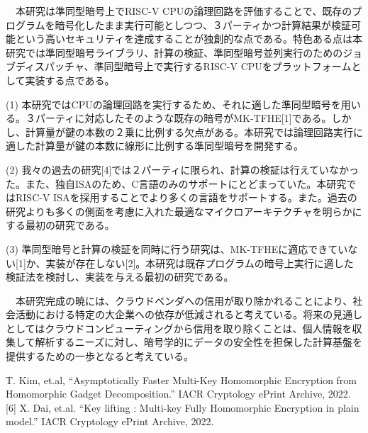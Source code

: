 
　本研究は準同型暗号上でRISC-V CPUの論理回路を評価することで、既存のプログラムを暗号化したまま実行可能としつつ、３パーティかつ計算結果が検証可能という高いセキュリティを達成することが独創的な点である。特色ある点は本研究では準同型暗号ライブラリ、計算の検証、準同型暗号並列実行のためのジョブディスパッチャ、準同型暗号上で実行するRISC-V CPUをプラットフォームとして実装する点である。


\noindent(1)	本研究ではCPUの論理回路を実行するため、それに適した準同型暗号を用いる。３パーティに対応したそのような既存の暗号がMK-TFHE[1]である。しかし、計算量が鍵の本数の２乗に比例する欠点がある。本研究では論理回路実行に適した計算量が鍵の本数に線形に比例する準同型暗号を開発する。

\noindent(2)	我々の過去の研究[4]では２パーティに限られ、計算の検証は行えていなかった。また、独自ISAのため、C言語のみのサポートにとどまっていた。本研究ではRISC-V ISAを採用することでより多くの言語をサポートする。また。過去の研究よりも多くの側面を考慮に入れた最適なマイクロアーキテクチャを明らかにする最初の研究である。

\noindent(3)	準同型暗号と計算の検証を同時に行う研究は、MK-TFHEに適応できていない[1]か、実装が存在しない[2]。本研究は既存プログラムの暗号上実行に適した検証法を検討し、実装を与える最初の研究である。


　本研究完成の暁には、クラウドベンダへの信用が取り除かれることにより、社会活動における特定の大企業への依存が低減されると考えている。将来の見通しとしてはクラウドコンピューティングから信用を取り除くことは、個人情報を収集して解析するニーズに対し、暗号学的にデータの安全性を担保した計算基盤を提供するための一歩となると考えている。

\noindent[参考文献] [5] T. Kim, et.al, “Asymptotically Faster Multi-Key Homomorphic Encryption from Homomorphic Gadget Decomposition.” IACR Cryptology ePrint Archive, 2022. [6] X. Dai, et.al. “Key lifting : Multi-key Fully Homomorphic Encryption in plain model.” IACR Cryptology ePrint Archive, 2022.




